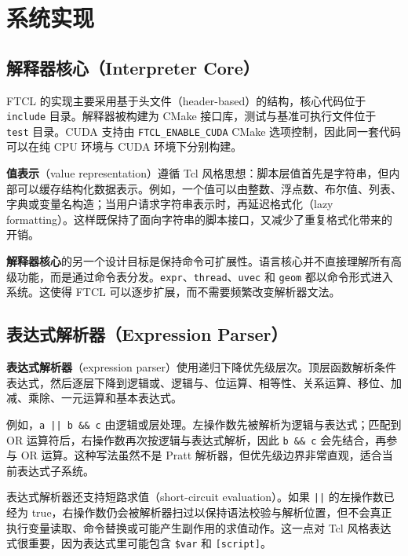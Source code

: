 ﻿\chapter{系统实现}

\section{解释器核心（Interpreter Core）}
FTCL 的实现主要采用基于头文件（header-based）的结构，核心代码位于 \texttt{include} 目录。解释器被构建为 CMake 接口库，测试与基准可执行文件位于 \texttt{test} 目录。CUDA 支持由 \texttt{FTCL\_ENABLE\_CUDA} CMake 选项控制，因此同一套代码可以在纯 CPU 环境与 CUDA 环境下分别构建。

\textbf{值表示}（value representation）遵循 Tcl 风格思想：脚本层值首先是字符串，但内部可以缓存结构化数据表示。例如，一个值可以由整数、浮点数、布尔值、列表、字典或变量名构造；当用户请求字符串表示时，再延迟格式化（lazy formatting）。这样既保持了面向字符串的脚本接口，又减少了重复格式化带来的开销。

\textbf{解释器核心}的另一个设计目标是保持命令可扩展性。语言核心并不直接理解所有高级功能，而是通过命令表分发。\texttt{expr}、\texttt{thread}、\texttt{uvec} 和 \texttt{geom} 都以命令形式进入系统。这使得 FTCL 可以逐步扩展，而不需要频繁改变解析器文法。

\section{表达式解析器（Expression Parser）}
\textbf{表达式解析器}（expression parser）使用递归下降优先级层次。顶层函数解析条件表达式，然后逐层下降到逻辑或、逻辑与、位运算、相等性、关系运算、移位、加减、乘除、一元运算和基本表达式。

例如，\texttt{a || b \&\& c} 由逻辑或层处理。左操作数先被解析为逻辑与表达式；匹配到 OR 运算符后，右操作数再次按逻辑与表达式解析，因此 \texttt{b \&\& c} 会先结合，再参与 OR 运算。这种写法虽然不是 Pratt 解析器，但优先级边界非常直观，适合当前表达式子系统。

表达式解析器还支持短路求值（short-circuit evaluation）。如果 \texttt{||} 的左操作数已经为 true，右操作数仍会被解析器扫过以保持语法校验与解析位置，但不会真正执行变量读取、命令替换或可能产生副作用的求值动作。这一点对 Tcl 风格表达式很重要，因为表达式里可能包含 \texttt{\$var} 和 \texttt{[script]}。


